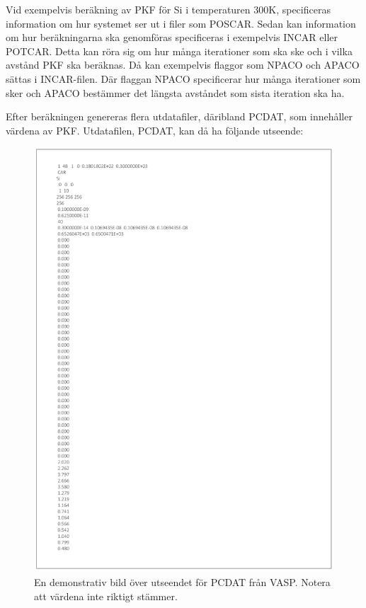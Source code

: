 \documentclass[10pt,oneside,swedish]{article}
\begin{document}
Vid exempelvis beräkning av PKF för Si i temperaturen 300K, specificeras
information om hur systemet ser ut i filer som POSCAR. Sedan kan
information om hur beräkningarna ska genomföras specificeras i
exempelvis INCAR eller POTCAR. Detta kan röra sig om hur många
iterationer som ska ske och i vilka avstånd PKF ska beräknas. Då kan
exempelvis flaggor som NPACO och APACO sättas i INCAR-filen. Där flaggan
NPACO specificerar hur många iterationer som sker och APACO bestämmer
det längsta avståndet som sista iteration ska ha.

Efter beräkningen genereras flera utdatafiler, däribland PCDAT, som
innehåller värdena av PKF. Utdatafilen, PCDAT, kan då ha följande
utseende:

\begin{figure}[H]\label{}
\centering
\includegraphics[width=1.00000\textwidth]{Images/PCDAT_utseende.png}
\caption{En demonstrativ bild över utseendet för PCDAT från VASP. Notera
att värdena inte riktigt stämmer.}
\end{figure}
\end{document}
